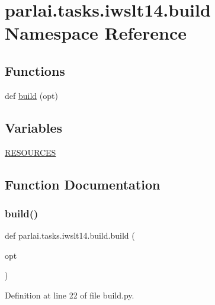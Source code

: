 \hypertarget{namespaceparlai_1_1tasks_1_1iwslt14_1_1build}{}\section{parlai.\+tasks.\+iwslt14.\+build Namespace Reference}
\label{namespaceparlai_1_1tasks_1_1iwslt14_1_1build}
\subsection*{Functions}
\begin{DoxyCompactItemize}
\item 
def \hyperlink{namespaceparlai_1_1tasks_1_1iwslt14_1_1build_a88091774178185753ae29ddad310f0ec}{build} (opt)
\end{DoxyCompactItemize}
\subsection*{Variables}
\begin{DoxyCompactItemize}
\item 
\hyperlink{namespaceparlai_1_1tasks_1_1iwslt14_1_1build_a1117136c67fac42f4009b271744df3e4}{R\+E\+S\+O\+U\+R\+C\+ES}
\end{DoxyCompactItemize}


\subsection{Function Documentation}
\mbox{\label{namespaceparlai_1_1tasks_1_1iwslt14_1_1build_a88091774178185753ae29ddad310f0ec}} 
\subsubsection{\texorpdfstring{build()}{build()}}
{\footnotesize\ttfamily def parlai.\+tasks.\+iwslt14.\+build.\+build (\begin{DoxyParamCaption}\item[{}]{opt }\end{DoxyParamCaption})}



Definition at line 22 of file build.\+py.


